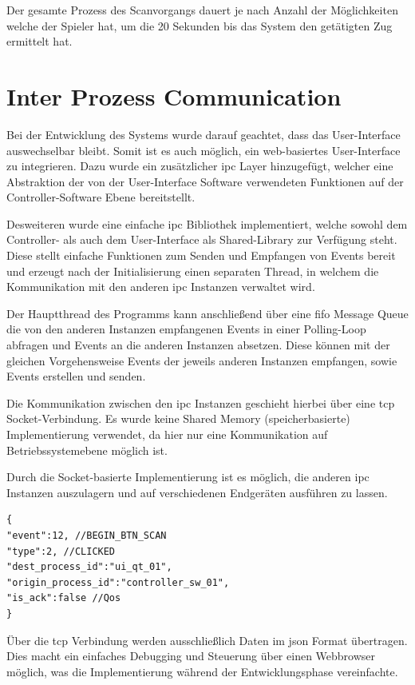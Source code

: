 Der gesamte Prozess des Scanvorgangs dauert je nach Anzahl der
Möglichkeiten welche der Spieler hat, um die 20 Sekunden bis das System
den getätigten Zug ermittelt hat.

\hypertarget{inter-prozess-communication}{%
\section{Inter Prozess
Communication}\label{inter-prozess-communication}}

Bei der Entwicklung des Systems wurde darauf geachtet, dass das
User-Interface auswechselbar bleibt. Somit ist es auch möglich, ein
web-basiertes User-Interface zu integrieren. Dazu wurde ein zusätzlicher
\gls{ipc} Layer hinzugefügt, welcher eine Abstraktion der von der
User-Interface Software verwendeten Funktionen auf der
Controller-Software Ebene bereitstellt.

Desweiteren wurde eine einfache \gls{ipc} Bibliothek implementiert,
welche sowohl dem Controller- als auch dem User-Interface als
Shared-Library zur Verfügung steht. Diese stellt einfache Funktionen zum
Senden und Empfangen von Events bereit und erzeugt nach der
Initialisierung einen separaten Thread, in welchem die Kommunikation mit
den anderen \gls{ipc} Instanzen verwaltet wird.

Der Hauptthread des Programms kann anschließend über eine \gls{fifo}
Message Queue die von den anderen Instanzen empfangenen Events in einer
Polling-Loop abfragen und Events an die anderen Instanzen absetzen.
Diese können mit der gleichen Vorgehensweise Events der jeweils anderen
Instanzen empfangen, sowie Events erstellen und senden.

Die Kommunikation zwischen den \gls{ipc} Instanzen geschieht hierbei
über eine \gls{tcp} Socket-Verbindung. Es wurde keine Shared Memory
(speicherbasierte) Implementierung verwendet, da hier nur eine
Kommunikation auf Betriebssystemebene möglich ist.

Durch die Socket-basierte Implementierung ist es möglich, die anderen
\gls{ipc} Instanzen auszulagern und auf verschiedenen Endgeräten
ausführen zu lassen.

\begin{lstlisting}
{
"event":12, //BEGIN_BTN_SCAN
"type":2, //CLICKED
"dest_process_id":"ui_qt_01",
"origin_process_id":"controller_sw_01",
"is_ack":false //Qos
}
\end{lstlisting}

Über die \gls{tcp} Verbindung werden ausschließlich Daten im \gls{json}
Format übertragen. Dies macht ein einfaches Debugging und Steuerung über
einen Webbrowser möglich, was die Implementierung während der
Entwicklungsphase vereinfachte.

